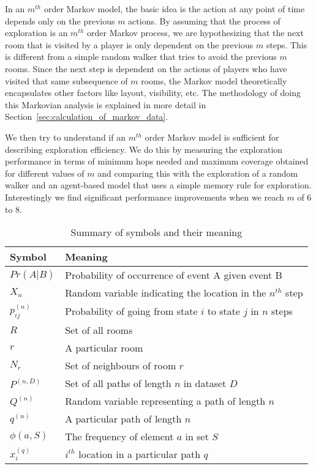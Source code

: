 In an $m^{th}$ order Markov model, the basic idea is the action at any point of time depends only on the previous $m$ actions. By assuming that the process of exploration is an $m^{th}$ order Markov process, we are hypothesizing that the next room that is visited by a player is only dependent on the previous $m$ steps. This is different from a simple random walker that tries to avoid the previous $m$ rooms. Since the next step is dependent on the actions of players who have visited that same subsequence of $m$ rooms, the Markov model theoretically encapsulates other factors like layout, visibility, etc. The methodology of doing this Markovian analysis is explained in more detail in Section~\ref{sec:calculation_of_markov_data}.

We then try to understand if an $m^{th}$ order Markov model is sufficient for describing exploration efficiency. We do this by measuring the exploration performance in terms of minimum hops needed and maximum coverage obtained for different values of $m$ and  comparing this with the exploration of a random walker and an agent-based model that uses a simple memory rule for exploration. Interestingly we find significant performance improvements when we reach $m$ of 6 to 8.

\begin{table*}[!tb]
\caption{Summary of symbols and their meaning}
\begin{tabular}{p{1.5in}p{5in}}
\tabularnewline
\hline\hline %
Symbol & Meaning \\
\hline
$Pr (A|B)$ & Probability of occurrence of event A given event B \\
$X_n$ & Random variable indicating the location in the $n^{th}$ step \\
$p^{(n)}_{ij}$ & Probability of going from state $i$ to state $j$ in $n$ steps \\
$R$ & Set of all rooms \\
$r$ & A particular room \\
$N_r$ & Set of neighbours of room $r$ \\
$P^{(n,D)}$ & Set of all paths of length $n$ in dataset $D$\\
$Q^{(n)}$ & Random variable representing a path of length $n$\\
$q^{(n)}$ & A particular path of length $n$\\
$\phi(a,S)$ & The frequency of element $a$ in set $S$\\
$x^{(q)}_{i}$ & $i^{th}$ location in a particular path $q$\\

\hline
\end{tabular}
\label{tab:Symbol_Table}
\end{table*}


